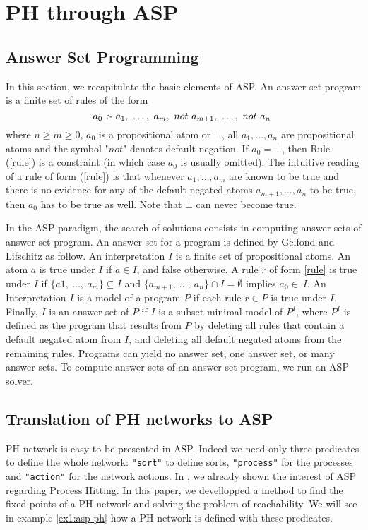 
\section{PH through ASP}
\label{sec:ph-asp}
\subsection{Answer Set Programming}

	In this section, we recapitulate the basic elements of ASP.
	An answer set program is a finite set of rules of the form
	\begin{equation}
		\label{rule}
		a_{0}\ \emph{:-}\ a_{1},\ \ldots,\ a_{m},\ not\ a_{m+1},\ \ldots,\ not\ a_{n}\
	\end{equation}
	where $n \ge m \ge 0$, $a_{0}$ is a propositional atom or $\bot$, all
	$a_{1}, \ldots ,a_{n}$ are propositional atoms and the symbol "$not$" denotes default negation.
	If $a_{0} = \bot$, then Rule (\ref{rule}) is a constraint (in which case $a_{0}$ is usually omitted).
	The intuitive reading of a rule of form (\ref{rule}) is that whenever $a_{1}, \ldots, a_{m}$
	are known to be true and there is no evidence for any of the default negated atoms $a_{m+1}, \ldots, a_{n}$ to be true, then $a_{0}$ has to be true as well.
	Note that $\bot$ can never become true.
	
	In the ASP paradigm, the search of solutions consists in computing answer sets of answer set program.
	An answer set for a program is defined by Gelfond and Lifschitz \cite{DBLP:conf/iclp/GelfondL88} as follow.
	An interpretation $I$ is a finite set of propositional atoms.
	An atom $a$ is true under $I$ if $a \in I$, and false otherwise.
	A rule $r$ of form \ref{rule} is true under $I$ if $\{a1,\ \dots,\ a_{m}\} \subseteq I$ and $\{a_{m+1},\ \ldots,\ a_{n}\} \cap I = \emptyset$ implies $a_{0} \in\ I$.
	An Interpretation $I$ is a model of a program $P$ if each rule $r \in P$ is true under $I$.
	Finally, $I$ is an answer set of $P$ if $I$ is a subset-minimal model of $P^{I}$,
	where $P^{I}$ is defined as the program that results from $P$ by deleting all rules that contain a default negated atom from $I$, 
	and deleting all default negated atoms from the remaining rules.
	Programs can yield no answer set, one answer set, or many answer sets.
	To compute answer sets of an answer set program, we run an ASP solver.

\subsection{Translation of PH networks to ASP}
PH network is easy to be presented in ASP. Indeed we need only three predicates to define the whole network:
\texttt{"sort"} to define sorts, \texttt{"process"} for the processes and \texttt{"action"} for the network actions.
In \cite{MOVEP14}, we already shown the interest of ASP regarding Process Hitting.
In this paper, we devellopped a method to find the fixed points of a PH network and solving the problem of reachability.
We will see in example \ref{ex1:asp-ph} how a PH network is defined with these predicates.



